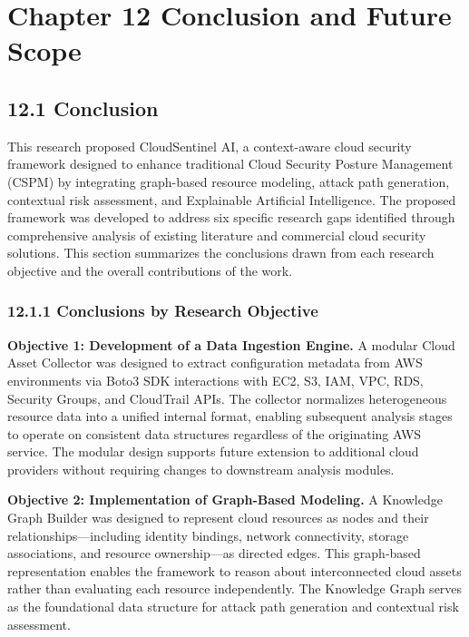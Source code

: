\section{Chapter 12 Conclusion and Future Scope}

\subsection{12.1 Conclusion}

This research proposed CloudSentinel AI, a context-aware cloud security framework designed to enhance traditional Cloud Security Posture Management (CSPM) by integrating graph-based resource modeling, attack path generation, contextual risk assessment, and Explainable Artificial Intelligence. The proposed framework was developed to address six specific research gaps identified through comprehensive analysis of existing literature and commercial cloud security solutions. This section summarizes the conclusions drawn from each research objective and the overall contributions of the work.

\subsubsection{12.1.1 Conclusions by Research Objective}

\textbf{Objective 1: Development of a Data Ingestion Engine.} A modular Cloud Asset Collector was designed to extract configuration metadata from AWS environments via Boto3 SDK interactions with EC2, S3, IAM, VPC, RDS, Security Groups, and CloudTrail APIs. The collector normalizes heterogeneous resource data into a unified internal format, enabling subsequent analysis stages to operate on consistent data structures regardless of the originating AWS service. The modular design supports future extension to additional cloud providers without requiring changes to downstream analysis modules.

\textbf{Objective 2: Implementation of Graph-Based Modeling.} A Knowledge Graph Builder was designed to represent cloud resources as nodes and their relationships---including identity bindings, network connectivity, storage associations, and resource ownership---as directed edges. This graph-based representation enables the framework to reason about interconnected cloud assets rather than evaluating each resource independently. The Knowledge Graph serves as the foundational data structure for attack path generation and contextual risk assessment.

